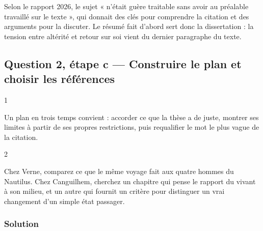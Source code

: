\documentclass[11pt,a4paper]{article}
\begin{document}
\begin{jury}

Selon le rapport 2026, le sujet « n'était guère traitable sans avoir au préalable travaillé sur le texte », qui donnait des clés pour comprendre la citation et des arguments pour la discuter. Le résumé fait d'abord sert donc la dissertation : la tension entre altérité et retour sur soi vient du dernier paragraphe du texte.

\end{jury}

\hypertarget{question-2-uxe9tape-c-construire-le-plan-et-choisir-les-ruxe9fuxe9rences}{%
\subsection{Question 2, étape c --- Construire le plan et choisir les références}\label{question-2-uxe9tape-c-construire-le-plan-et-choisir-les-ruxe9fuxe9rences}}

\begin{indication}{1}

Un plan en trois temps convient : accorder ce que la thèse a de juste, montrer ses limites à partir de ses propres restrictions, puis requalifier le mot le plus vague de la citation.

\end{indication}

\begin{indication}{2}

Chez Verne, comparez ce que le même voyage fait aux quatre hommes du Nautilus. Chez Canguilhem, cherchez un chapitre qui pense le rapport du vivant à son milieu, et un autre qui fournit un critère pour distinguer un vrai changement d'un simple état passager.

\end{indication}

\hypertarget{solution-5}{%
\subsubsection{Solution}\label{solution-5}}
\end{document}
